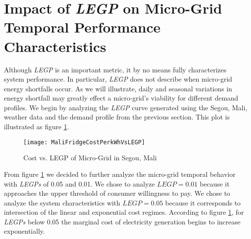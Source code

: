 \documentclass{article}
\begin{document}
\section{Impact of \emph{LEGP} on Micro-Grid Temporal Performance Characteristics}



	







Although \emph{LEGP} is an important metric, it by no means fully characterizes system performance. 
In particular, \emph{LEGP} does not describe when micro-grid energy shortfalls occur.
As we will illustrate, daily and seasonal variations in energy shortfall may greatly effect a micro-grid's viability for different demand profiles. 
We begin by analyzing the \emph{LEGP} curve generated using the Segou, Mali, weather data and the demand profile from the previous section. 
This plot is illustrated as figure \ref{CostVLEGPMali}.

\begin{figure}[ht]  
  \centering
    \texttt{[image: MaliFridgeCostPerkWhVsLEGP]}
  \caption{Cost vs. LEGP of Micro-Grid in Segou, Mali}
  \label{CostVLEGPMali}
\end{figure}

From figure \ref{CostVLEGPMali} we decided to further analyze the micro-grid temporal behavior with \emph{LEGPs} of 0.05 and 0.01.
 We chose to analyze $LEGP = 0.01$ because it approaches the upper threshold of consumer willingness to pay.
We chose to analyze the system characteristics with $LEGP = 0.05$ because it corresponds to intersection of the linear and exponential cost regimes.
According to figure \ref{CostVLEGPMali}, for \emph{LEGPs} below 0.05 the marginal cost of electricity generation begins to increase exponentially.  
\end{document}
